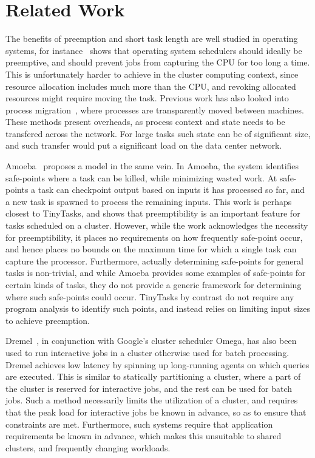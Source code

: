 \section{Related Work}
The benefits of preemption and short task length are well studied in operating systems, for
instance~\cite{sherman1972trace} shows that operating system schedulers should ideally be preemptive, and should prevent
jobs from capturing the CPU for too long a time. This is unfortunately harder to achieve in the cluster computing
context, since resource allocation includes much more than the CPU, and revoking allocated resources might require
moving the task. Previous work has also looked into process migration~\cite{douglis1991transparent,milojivcic2000process},
where processes are transparently moved between machines. These methods present overheads, as process context and state
needs to be transfered across the network. For large tasks such state can be of significant size, and such transfer
would put a significant load on the data center network. 

Amoeba~\cite{ananthanarayanan2012true} proposes a model in the same vein. In Amoeba, the system identifies safe-points
where a task can be killed, while minimizing wasted work. At safe-points a task can checkpoint output based on inputs it
has processed so far, and a new task is spawned to process the remaining inputs. This work is perhaps closest to
TinyTasks, and shows that preemptibility is an important feature for tasks scheduled on a cluster. However, while the
work acknowledges the necessity for preemptibility, it places no requirements on how frequently safe-point occur, and
hence places no bounds on the maximum time for which a single task can capture the processor. Furthermore, actually
determining safe-points for general tasks is non-trivial, and while Amoeba provides some examples of safe-points for
certain kinds of tasks, they do not provide a generic framework for determining where such safe-points could occur.
TinyTasks by contrast do not require any program analysis to identify such points, and instead relies on limiting input
sizes to achieve preemption.

Dremel~\cite{melnik2010dremel}, in conjunction with Google's cluster scheduler Omega, has also been used to run
interactive jobs in a cluster otherwise used for batch processing. Dremel achieves low latency by spinning up
long-running agents on which queries are executed. This is similar to statically partitioning a cluster, where a part of
the cluster is reserved for interactive jobs, and the rest can be used for batch jobs. Such a method necessarily limits
the utilization of a cluster, and requires that the peak load for interactive jobs be known in advance, so as to ensure
that constraints are met. Furthermore, such systems require that application requirements be known in advance, which
makes this unsuitable to shared clusters, and frequently changing workloads.

